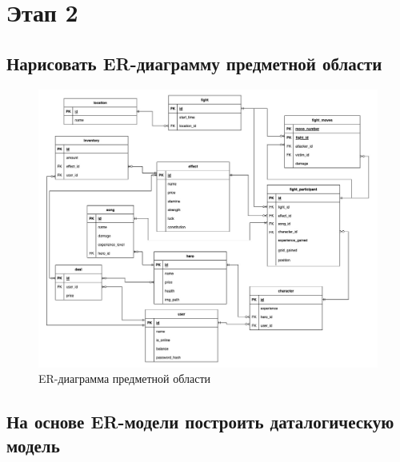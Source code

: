 \section*{Этап 2}


\subsection*{Нарисовать ER-диаграмму предметной области}


\begin{figure}[H]
	\begin{center}
		\includegraphics[scale=0.46]{images/ER.jpg}
		\caption{ER-диаграмма предметной области}
	\end{center}
\end{figure}

\subsection*{На основе ER-модели построить даталогическую модель}



